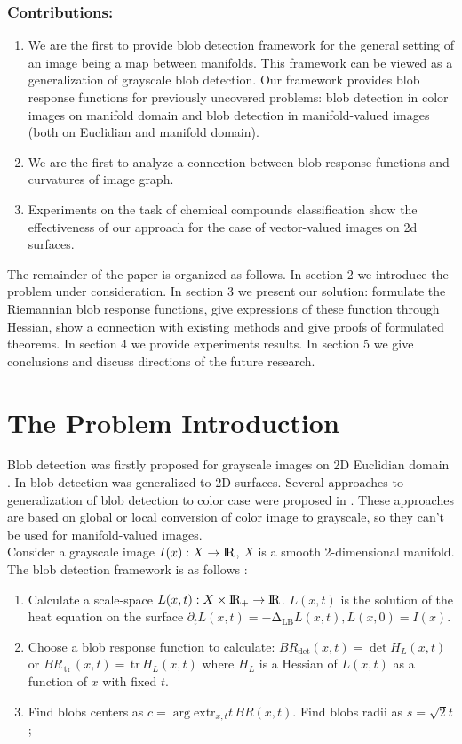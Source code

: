 \documentclass{llncs}
\newcommand{\LaplaceBeltrami}{\mathrm{\Delta_{{LB}}}}
\newcommand{\partderiv}[2]{\partial_{#2} {#1}}
\newcommand{\extr}[1]{\mathrm{extr}_{#1}}
\newcommand{\toreal}{\rightarrow\bbbr}
\newcommand {\tr}{{\,}\mathrm{tr}{\,}}
\begin{document}
\subsubsection{Contributions:}
\begin{enumerate}
\item We are the first to provide blob detection framework for the general setting of an image being a map between manifolds. This framework can be viewed as a generalization of grayscale blob detection. Our framework provides blob response functions for previously uncovered problems: blob detection in color images on manifold domain and blob detection in manifold-valued images (both on Euclidian and manifold domain). 
\item We are the first to analyze a connection between blob response functions and curvatures of image graph.
\item Experiments on the task of chemical compounds classification show the effectiveness of our approach for the case of vector-valued images on 2d surfaces.  
\end{enumerate}

The remainder of the paper is organized as follows. In section 2 we introduce the problem under consideration. In section 3 we present our solution: formulate the Riemannian blob response functions, give expressions of these function through Hessian, show a connection with existing methods and give proofs of formulated theorems. In section 4 we provide experiments results. In section 5 we give conclusions and discuss directions of the future research.

\section{The Problem Introduction}
Blob detection was firstly proposed for grayscale images on 2D Euclidian domain \cite{blob}. In \cite{ScalarBlob3D} blob detection was generalized to 2D surfaces. Several approaches to generalization of blob detection to color case were proposed in \cite{ColorBlob,GROM}. These approaches are based on global or local conversion of color image to grayscale, so they can't be used for manifold-valued images.
\\
Consider a grayscale image $I(x):X \toreal$, $X$ is a smooth 2-dimensional manifold. The blob detection framework is as follows \cite{ScalarBlob3D}:
\begin{enumerate} 
\item Calculate a scale-space $L(x,t):X\times \bbbr_{+} \toreal$. $L(x,t)$ is the solution of the heat equation on the surface
  $\partderiv{L(x, t)}{t}=-\LaplaceBeltrami{ L(x, t)},L(x, 0)=I(x)$.
\item Choose a blob response function to calculate: $BR_{\det}(x, t)=\det{H_L(x,t)}$ or $BR_{\tr}(x, t)=\tr {H_L(x,t)}$ where $H_L$ is a Hessian of $L(x, t)$ as a function of $x$ with fixed $t$.
\item Find blobs centers as $c=\arg \extr{x,t} t\,BR(x, t)$. Find blobs radii as $s=\sqrt{2} t$;
\end{enumerate}
\end{document}
